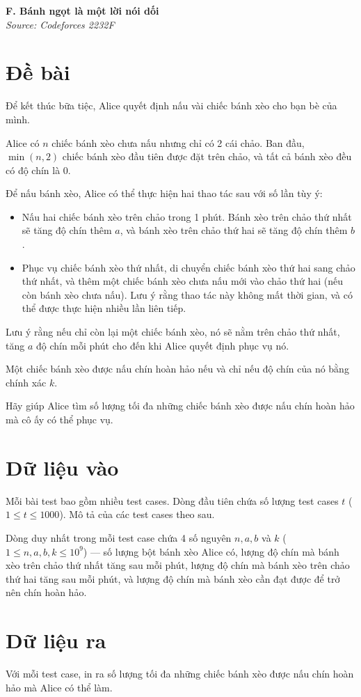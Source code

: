 \documentclass[11pt]{article}
\newcommand{\problem}[2]{
    \begin{problembox}
    \begin{center}
        \Large \textbf{#1} \\
        \vspace{0.2cm}
        \small \textit{Source: #2}
    \end{center}
    \end{problembox}
}
\begin{document}
\newpage
\problem{F. Bánh ngọt là một lời nói dối}{Codeforces 2232F}

\section*{Đề bài}
Để kết thúc bữa tiệc, Alice quyết định nấu vài chiếc bánh xèo cho bạn bè của mình.

Alice có $n$ chiếc bánh xèo chưa nấu nhưng chỉ có 2 cái chảo. Ban đầu, $\min(n, 2)$ chiếc bánh xèo đầu tiên được đặt trên chảo, và tất cả bánh xèo đều có độ chín là 0.

Để nấu bánh xèo, Alice có thể thực hiện hai thao tác sau với số lần tùy ý:
\begin{itemize}
    \item Nấu hai chiếc bánh xèo trên chảo trong 1 phút. Bánh xèo trên chảo thứ nhất sẽ tăng độ chín thêm $a$, và bánh xèo trên chảo thứ hai sẽ tăng độ chín thêm $b$.
    \item Phục vụ chiếc bánh xèo thứ nhất, di chuyển chiếc bánh xèo thứ hai sang chảo thứ nhất, và thêm một chiếc bánh xèo chưa nấu mới vào chảo thứ hai (nếu còn bánh xèo chưa nấu). Lưu ý rằng thao tác này không mất thời gian, và có thể được thực hiện nhiều lần liên tiếp.
\end{itemize}

Lưu ý rằng nếu chỉ còn lại một chiếc bánh xèo, nó sẽ nằm trên chảo thứ nhất, tăng $a$ độ chín mỗi phút cho đến khi Alice quyết định phục vụ nó.

Một chiếc bánh xèo được nấu chín hoàn hảo nếu và chỉ nếu độ chín của nó bằng chính xác $k$.

Hãy giúp Alice tìm số lượng tối đa những chiếc bánh xèo được nấu chín hoàn hảo mà cô ấy có thể phục vụ.

\section*{Dữ liệu vào}
Mỗi bài test bao gồm nhiều test cases. Dòng đầu tiên chứa số lượng test cases $t$ ($1 \le t \le 1000$). Mô tả của các test cases theo sau.

Dòng duy nhất trong mỗi test case chứa 4 số nguyên $n, a, b$ và $k$ ($1 \le n, a, b, k \le 10^9$) — số lượng bột bánh xèo Alice có, lượng độ chín mà bánh xèo trên chảo thứ nhất tăng sau mỗi phút, lượng độ chín mà bánh xèo trên chảo thứ hai tăng sau mỗi phút, và lượng độ chín mà bánh xèo cần đạt được để trở nên chín hoàn hảo.

\section*{Dữ liệu ra}
Với mỗi test case, in ra số lượng tối đa những chiếc bánh xèo được nấu chín hoàn hảo mà Alice có thể làm.
\end{document}
